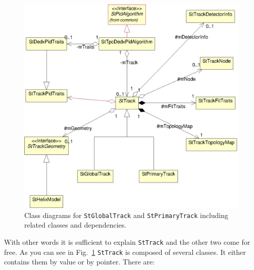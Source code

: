 \documentclass[twoside]{article}
\begin{document}
\begin{figure}[p]
    \begin{center}
        \includegraphics{tracks.eps}
        \caption{Class diagrams for \texttt{StGlobalTrack} and
            \texttt{StPrimaryTrack} including related classes
            and dependencies.}
        \label{fig:umlTracks}
    \end{center}
\end{figure}
With other words it is sufficient to explain \texttt{StTrack} and the
other two come for free. As you can see in Fig.~\ref{fig:umlTracks}
\texttt{StTrack} is composed of several classes. It either contains
them by value or by pointer. There are:
\end{document}
